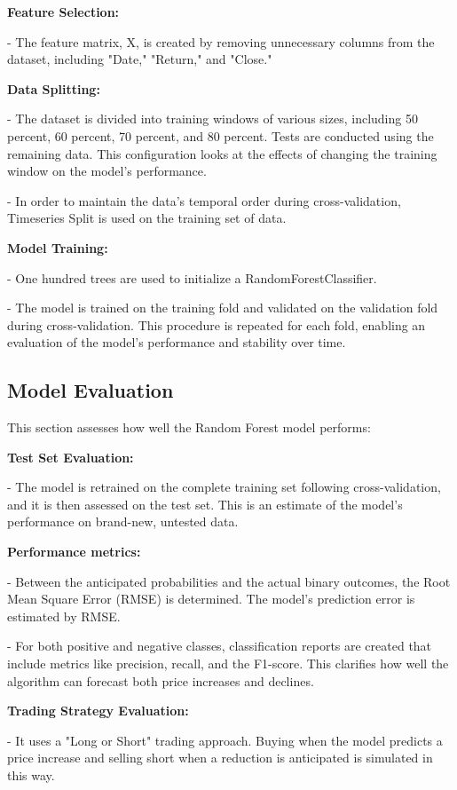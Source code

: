 \textbf{Feature Selection:}

-	The feature matrix, X, is created by removing unnecessary columns from the dataset, including "Date," "Return," and "Close."

\textbf{Data Splitting:}

-	The dataset is divided into training windows of various sizes, including 50 percent, 60 percent, 70 percent, and 80 percent. Tests are conducted using the remaining data. This configuration looks at the effects of changing the training window on the model's performance.

-	In order to maintain the data's temporal order during cross-validation, Timeseries Split is used on the training set of data.

\textbf{Model Training:}

-	One hundred trees are used to initialize a RandomForestClassifier.

-	The model is trained on the training fold and validated on the validation fold during cross-validation. This procedure is repeated for each fold, enabling an evaluation of the model's performance and stability over time.

\subsection{Model Evaluation}

This section assesses how well the Random Forest model performs:

\textbf{Test Set Evaluation:}

-	The model is retrained on the complete training set following cross-validation, and it is then assessed on the test set. This is an estimate of the model's performance on brand-new, untested data.

\textbf{Performance metrics:}

-	Between the anticipated probabilities and the actual binary outcomes, the Root Mean Square Error (RMSE) is determined. The model's prediction error is estimated by RMSE.

-	For both positive and negative classes, classification reports are created that include metrics like precision, recall, and the F1-score. This clarifies how well the algorithm can forecast both price increases and declines.

\textbf{Trading Strategy Evaluation:}

-	It uses a "Long or Short" trading approach. Buying when the model predicts a price increase and selling short when a reduction is anticipated is simulated in this way.

